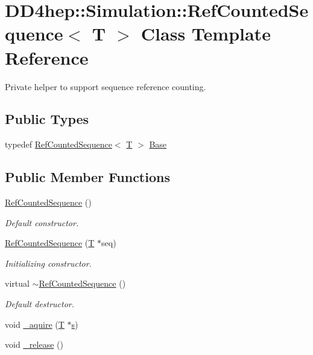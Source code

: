 \hypertarget{class_d_d4hep_1_1_simulation_1_1_ref_counted_sequence}{
\section{DD4hep::Simulation::RefCountedSequence$<$ T $>$ Class Template Reference}
\label{class_d_d4hep_1_1_simulation_1_1_ref_counted_sequence}
}


Private helper to support sequence reference counting.  
\subsection*{Public Types}
\begin{DoxyCompactItemize}
\item 
typedef \hyperlink{class_d_d4hep_1_1_simulation_1_1_ref_counted_sequence}{RefCountedSequence}$<$ \hyperlink{class_t}{T} $>$ \hyperlink{class_d_d4hep_1_1_simulation_1_1_ref_counted_sequence_a04dc466201b2e556a020b1282313876c}{Base}
\end{DoxyCompactItemize}
\subsection*{Public Member Functions}
\begin{DoxyCompactItemize}
\item 
\hyperlink{class_d_d4hep_1_1_simulation_1_1_ref_counted_sequence_aff7f878ef368a341330fe3c5a8fd475d}{RefCountedSequence} ()
\begin{DoxyCompactList}\small\item\em Default constructor. \item\end{DoxyCompactList}\item 
\hyperlink{class_d_d4hep_1_1_simulation_1_1_ref_counted_sequence_ab5c6370432d98faa4b0ba884afa63add}{RefCountedSequence} (\hyperlink{class_t}{T} $\ast$seq)
\begin{DoxyCompactList}\small\item\em Initializing constructor. \item\end{DoxyCompactList}\item 
virtual \hyperlink{class_d_d4hep_1_1_simulation_1_1_ref_counted_sequence_a316644b6bcf4dd7e2b57588a9779bf59}{$\sim$RefCountedSequence} ()
\begin{DoxyCompactList}\small\item\em Default destructor. \item\end{DoxyCompactList}\item 
void \hyperlink{class_d_d4hep_1_1_simulation_1_1_ref_counted_sequence_a186785a2a36bfb4dd0468978f4883328}{\_\-aquire} (\hyperlink{class_t}{T} $\ast$\hyperlink{_volumes_8cpp_a17ca6bfc8040d695d3cada22a4763d40}{s})
\item 
void \hyperlink{class_d_d4hep_1_1_simulation_1_1_ref_counted_sequence_a81c7e6e88d05887495b28cded6899da9}{\_\-release} ()
\end{DoxyCompactItemize}

